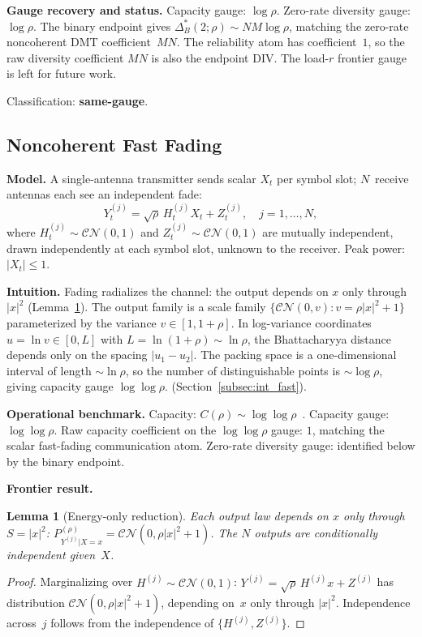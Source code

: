 \documentclass[lettersize,onecolumn]{IEEEtran}
\newtheorem{lemma}{Lemma}
\newcommand{\snr}{\rho}
\begin{document}
\textbf{Gauge recovery and status.}
Capacity gauge: $\log\snr$. Zero-rate diversity gauge: $\log\snr$.
The binary endpoint gives
$\Delta_B^*(2;\snr) \sim NM\log\snr$, matching the zero-rate
noncoherent DMT coefficient~$MN$. The reliability atom has
coefficient~$1$, so the raw diversity coefficient $MN$ is also the
endpoint DIV\@. The load-$r$ frontier gauge is left for future
work.

Classification: \textbf{same-gauge}.

\subsection{Noncoherent Fast Fading}\label{subsec:ch_fast}

\textbf{Model.}
A single-antenna transmitter sends scalar $X_t$ per symbol slot;
$N$~receive antennas each see an independent fade:
\begin{equation}\label{eq:model_fast}
Y_t^{(j)} = \sqrt{\snr}\,H_t^{(j)} X_t + Z_t^{(j)},
\quad j=1,\dots,N,
\end{equation}
where $H_t^{(j)} \sim \mathcal{CN}(0,1)$ and
$Z_t^{(j)} \sim \mathcal{CN}(0,1)$ are mutually independent, drawn
independently at each symbol slot, unknown to the receiver.
Peak power: $|X_t| \le 1$.

\textbf{Intuition.}
Fading radializes the channel: the output depends on $x$ only
through $|x|^2$ (Lemma~\ref{lem:energy_only}). The output family is
a scale family $\{\mathcal{CN}(0,v): v=\snr|x|^2+1\}$ parameterized
by the variance $v\in[1,1+\snr]$. In log-variance coordinates
$u = \ln v \in [0,L]$ with $L = \ln(1+\snr)\sim\ln\snr$, the
Bhattacharyya distance depends only on the spacing
$|u_1-u_2|$. The packing space is a one-dimensional interval of
length $\sim\ln\snr$, so the number of distinguishable points is
$\sim\log\snr$, giving capacity gauge $\log\log\snr$.
(Section~\ref{subsec:int_fast}).

\textbf{Operational benchmark.}
Capacity: $C(\snr)\sim\log\log\snr$~\cite{LapidothMoser2003}.
Capacity gauge: $\log\log\snr$. Raw capacity coefficient on the
$\log\log\snr$ gauge: $1$, matching the scalar fast-fading
communication atom. Zero-rate diversity gauge: identified below by
the binary endpoint.

\textbf{Frontier result.}

\begin{lemma}[Energy-only reduction]\label{lem:energy_only}
Each output law depends on $x$ only through $S = |x|^2$:
$P_{Y^{(j)}|X=x}^{(\snr)} = \mathcal{CN}(0,\snr|x|^2+1)$.
The $N$ outputs are conditionally independent given~$X$.
\end{lemma}
\begin{proof}
Marginalizing over $H^{(j)} \sim \mathcal{CN}(0,1)$:
$Y^{(j)} = \sqrt{\snr}\,H^{(j)} x + Z^{(j)}$
has distribution $\mathcal{CN}(0, \snr|x|^2 + 1)$, depending
on~$x$ only through $|x|^2$. Independence across~$j$ follows from
the independence of $\{H^{(j)}, Z^{(j)}\}$.
\end{proof}
\end{document}
